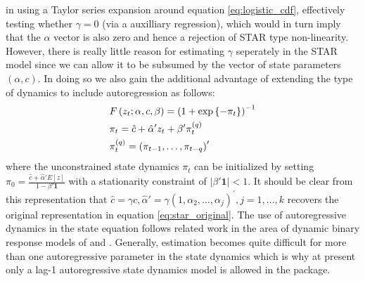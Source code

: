 in \cite{Luukkonen1988} using a Taylor series expansion around
equation \ref{eq:logistic_cdf}, effectively testing whether $\gamma=0$ (via
a auxilliary regression), which would in turn imply that the $\alpha$ vector is
also zero and hence a rejection of STAR type non-linearity.
However, there is really little reason for estimating $\gamma$ seperately in the
STAR model since we can allow it to be subsumed by the vector of state 
parameters $\left(\alpha, c \right)$. In doing so we also gain the additional
advantage of extending the type of dynamics to include autoregression as
follows:
\begin{equation}\label{eq:star_new}
\begin{gathered}
  F\left( {{z_t};\alpha ,c,\beta} \right) = {\left( {1 + \exp \left\{ -{{\pi
  _t}} \right\}} \right)^{ - 1}} \hfill \\
  {\pi _t} = \hat c + \hat \alpha '{z_t} + \beta '\pi _t^{\left( q \right)} \hfill \\
  \pi _t^{\left( q \right)} = {\left( {{\pi _{t - 1}},\dots,{\pi _{t - q}}}
  \right)^\prime } \hfill \\
\end{gathered}
\end{equation}
where the unconstrained state dynamics $\pi_t$ can be initialized by setting
${\pi _0} =\frac{{\hat c + \hat \alpha 'E\left[ z \right]}}{{1 - \beta
'{\mathbf{1}}}}$ with a stationarity constraint of $\left| {\beta
'{\mathbf{1}}} \right| < 1$.
It should be  clear from this representation that  $\hat c = \gamma c,\hat
\alpha ' = \gamma {\left( {1,{\alpha _2},\dots,{\alpha _j}} \right)^\prime },j =
1,\dots,k$ recovers the  original representation in equation
\ref{eq:star_original}. The use of  autoregressive dynamics in the state
equation follows related work in the  area of dynamic binary response models of 
\cite{Kauppi2008} and \cite{Nyberg2010}.
Generally, estimation becomes quite difficult for more than one autoregressive
parameter in the state dynamics which is why at present only a lag-1
autoregressive state dynamics model is allowed in the package.


